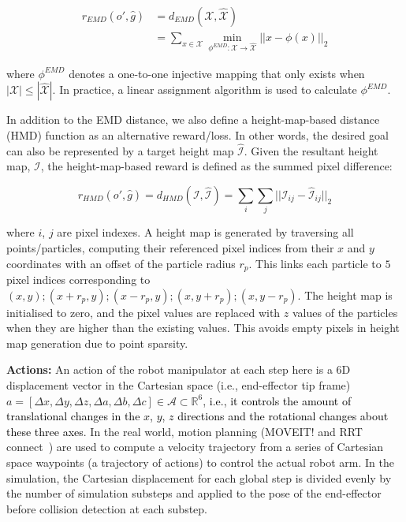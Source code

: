 \documentclass[letterpaper, 10 pt, journal, twoside]{ieeetran}
\newcommand{\rp}[1]{\textcolor{black}{#1}}
\begin{document}
\begin{equation}\label{eq:emd}
\begin{split}
r_{EMD}(o',\hat{g}) & = d_{EMD}(\mathcal{X}, \hat{\mathcal{X}}) \\
& = \sum_{x\in\mathcal{X}}\min_{\phi^{EMD}:\mathcal{X}\rightarrow\hat{\mathcal{X}}}||x-\phi(x)||_2
\end{split}
\end{equation}

\noindent where $\phi^{EMD}$ denotes a one-to-one injective mapping that only exists when $|\mathcal{X}|\leq|\hat{\mathcal{X}}|$. In practice, a linear assignment algorithm is used to calculate $\phi^{EMD}$. 

In addition to the EMD distance, we also define a height-map-based distance (HMD) function as an alternative reward/loss. In other words, the desired goal can also be represented by a target height map $\hat{\mathcal{I}}$. Given the resultant height map, $\mathcal{I}$, the height-map-based reward is defined as the summed pixel difference:

\begin{equation}\label{eq:hm}
r_{HMD}(o',\hat{g}) = d_{HMD}(\mathcal{I}, \hat{\mathcal{I}}) = \sum_i\sum_j ||\mathcal{I}_{ij}-\hat{\mathcal{I}}_{ij}||_2
\end{equation}

\noindent where $i$, $j$ are pixel indexes. A height map is generated by traversing all points/particles, computing their referenced pixel indices from their $x$ and $y$ coordinates with an offset of the particle radius $r_p$. This links each particle to $5$ pixel indices corresponding to $(x,y);(x+r_p, y);(x-r_p, y);(x,y+r_p);(x,y-r_p)$. The height map is initialised to zero, and the pixel values are replaced with $z$ values of the particles when they are higher than the existing values. This avoids empty pixels in height map generation due to point sparsity.

\textbf{Actions:} An action of the robot manipulator at each step here is a 6D displacement vector in the Cartesian space (i.e., end-effector tip frame) $a=[\Delta x, \Delta y, \Delta z, \Delta a, \Delta b, \Delta c]\in\mathcal{A}\subset\mathbb{R}^6$, \rp{i.e., it controls the amount of translational changes in the $x$, $y$, $z$ directions and the rotational changes about these three axes}. In the real world, motion planning (MOVEIT! and RRT connect~\cite{kuffner2000rrt,sucan2012ompl,Gorner2019Moveit}) are used to compute a velocity trajectory from a series of Cartesian space waypoints (a trajectory of actions) to control the actual robot arm. In the simulation, the Cartesian displacement for each global step is divided evenly by the number of simulation substeps and applied to the pose of the end-effector before collision detection at each substep.
\end{document}
